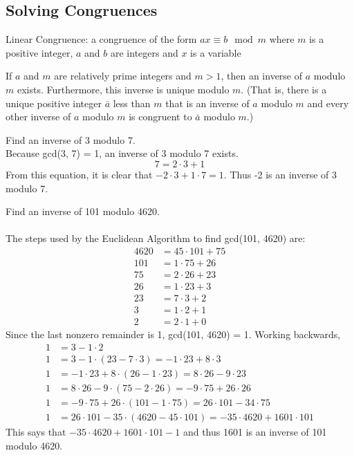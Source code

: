 \documentclass[12pt]{article}
\begin{document}
\subsection{Solving Congruences}
\begin{definition} Linear Congruence: a congruence of the form $ax \equiv b \mod m$ where $m$ is a positive integer, $a$ and $b$ are integers and $x$ is a variable \end{definition} 
\begin{theorem} If $a$ and $m$ are relatively prime integers and $m > 1$, then an inverse of $a$ modulo $m$ exists. Furthermore, this inverse is unique modulo $m$. (That is, there is a unique positive integer $\bar{a}$ less than $m$ that is an inverse of $a$ modulo $m$ and every other inverse of $a$ modulo $m$ is congruent to $\bar{a}$ modulo $m$.) \end{theorem} 
\begin{example} Find an inverse of 3 modulo 7. \\ Because gcd(3, 7) = 1, an inverse of 3 modulo 7 exists. $$7 = 2 \cdot 3 + 1 $$ From this equation, it is clear that $-2 \cdot 3 + 1 \cdot 7 = 1$. Thus -2 is an inverse of 3 modulo 7. \end{example} 
\begin{example} Find an inverse of 101 modulo 4620. \\~\\ The steps used by the Euclidean Algorithm to find gcd(101, 4620) are: $$\begin{aligned} 
4620 &= 45 \cdot 101 + 75 \\ 
101 &= 1 \cdot 75 + 26 \\ 
75 &= 2 \cdot 26 + 23 \\ 
26 &= 1 \cdot 23 + 3 \\ 
23 &= 7 \cdot 3 + 2 \\ 
3 &= 1 \cdot 2 + 1 \\ 
2 &= 2 \cdot 1 + 0 \end{aligned} $$ 
Since the last nonzero remainder is 1, gcd(101, 4620) = 1. Working backwards, $$\begin{aligned} 
1 &= 3 - 1 \cdot 2 \\
1 &= 3 - 1 \cdot (23 - 7 \cdot 3) = -1 \cdot 23 + 8 \cdot 3 \\
1 &= -1 \cdot 23 + 8 \cdot (26 - 1 \cdot 23) = 8 \cdot 26 - 9 \cdot 23 \\ 
1 &= 8 \cdot 26 - 9 \cdot (75 - 2 \cdot 26) = -9 \cdot 75 + 26 \cdot 26 \\ 
1 &= -9 \cdot 75 + 26 \cdot (101 - 1 \cdot 75) = 26 \cdot 101 - 34 \cdot 75 \\ 
1 &= 26 \cdot 101 - 35 \cdot (4620 - 45 \cdot 101) = -35 \cdot 4620 + 1601 \cdot 101 \end{aligned} $$
This says that $-35 \cdot 4620 + 1601 \cdot 101 - 1$ and thus 1601 is an inverse of 101 modulo 4620. \end{example} 
\end{document}

